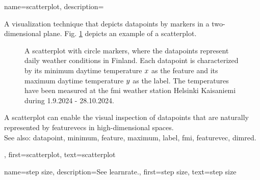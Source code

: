 {name={scatterplot}, 
	description={A 
		visualization technique that depicts \glspl{datapoint} by markers in a two-dimensional plane. 
		Fig. \ref{fig_scatterplot_temp_FMI_dict} depicts an example of a scatterplot.  
		\begin{figure}[H]
			\begin{center}
				\vspace*{-10mm}
			\end{center}
			\caption{A scatterplot with circle markers, where the \glspl{datapoint} represent daily weather conditions in Finland. 
				Each \gls{datapoint} is characterized by its \gls{minimum} daytime temperature $x$ 
				as the \gls{feature} and its \gls{maximum} daytime temperature $y$ as the \gls{label}. 
				The temperatures have been measured at the \gls{fmi} weather station Helsinki Kaisaniemi 
				during 1.9.2024 - 28.10.2024.}
			\label{fig_scatterplot_temp_FMI_dict}
			\vspace*{-3mm}
			\end{figure}
		A scatterplot can enable the visual inspection of \glspl{datapoint} that are naturally 
		represented by \glspl{featurevec} in high-dimensional spaces.
		\\
		See also: \gls{datapoint}, \gls{minimum}, \gls{feature}, \gls{maximum}, \gls{label}, \gls{fmi}, \gls{featurevec}, \gls{dimred}.},
	first={scatterplot},
	text={scatterplot} 
}


{name={step size}, 
	description={See \gls{learnrate}.}, 
	first={step size},
	text={step size} 
}


